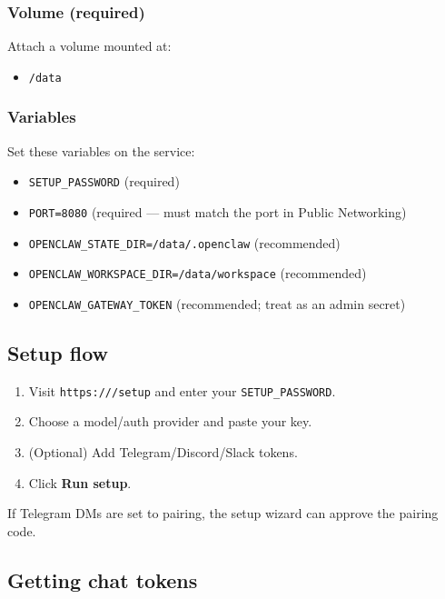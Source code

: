 \subsubsection{Volume (required)}


Attach a volume mounted at:

\begin{itemize}
  \item \texttt{/data}
\end{itemize}


\subsubsection{Variables}


Set these variables on the service:

\begin{itemize}
  \item \texttt{SETUP\_PASSWORD} (required)
  \item \texttt{PORT=8080} (required — must match the port in Public Networking)
  \item \texttt{OPENCLAW\_STATE\_DIR=/data/.openclaw} (recommended)
  \item \texttt{OPENCLAW\_WORKSPACE\_DIR=/data/workspace} (recommended)
  \item \texttt{OPENCLAW\_GATEWAY\_TOKEN} (recommended; treat as an admin secret)
\end{itemize}


\subsection{Setup flow}


\begin{enumerate}
  \item Visit \texttt{https:///setup} and enter your \texttt{SETUP\_PASSWORD}.
  \item Choose a model/auth provider and paste your key.
  \item (Optional) Add Telegram/Discord/Slack tokens.
  \item Click \textbf{Run setup}.
\end{enumerate}


If Telegram DMs are set to pairing, the setup wizard can approve the pairing code.

\subsection{Getting chat tokens}


